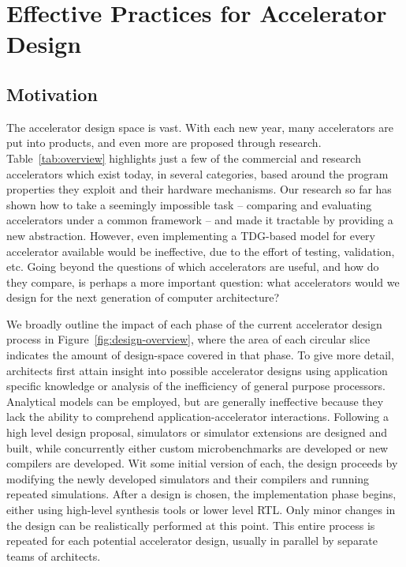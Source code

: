 \section{Effective Practices for Accelerator Design} \label{sec:design}

\subsection{Motivation}
The accelerator design space is vast.  With each new year, many accelerators
are put into products, and even more are proposed through research.  
Table~\ref{tab:overview} highlights just a few of the commercial and 
research accelerators which exist today, in several categories, based around
the program properties they exploit and their hardware mechanisms.
Our research so far
has shown how to take a seemingly impossible task -- comparing and evaluating
accelerators under a common framework -- and made it tractable by providing a
new abstraction.  However, even implementing a TDG-based model for every accelerator
available would be ineffective, due to the effort of testing, validation, etc.
Going beyond the questions of which accelerators are useful, and how do they compare,
is perhaps a more important question: what accelerators would we design for the
next generation of computer architecture?

We broadly outline the impact
of each phase of the current accelerator design process
in Figure~\ref{fig:design-overview}, where the area
of each circular slice indicates the amount of design-space covered in that
phase.  To give more detail, architects first attain insight into possible
accelerator designs using application specific knowledge or analysis of the
inefficiency of general purpose processors.  Analytical models can be
employed, but are generally ineffective because they lack the ability to
comprehend application-accelerator interactions.  Following a high level design
proposal, simulators or simulator extensions are designed and built, while
concurrently either custom microbenchmarks are developed or new compilers are
developed.  Wit some initial version of each, the design
proceeds by modifying the newly developed simulators
and their compilers and running repeated simulations.  After a design is chosen, the
implementation phase begins, either using high-level synthesis tools or lower
level RTL.  Only minor changes in the design can be realistically performed at
this point.  This entire process is repeated for each potential
accelerator design, usually in parallel by separate teams of architects.

